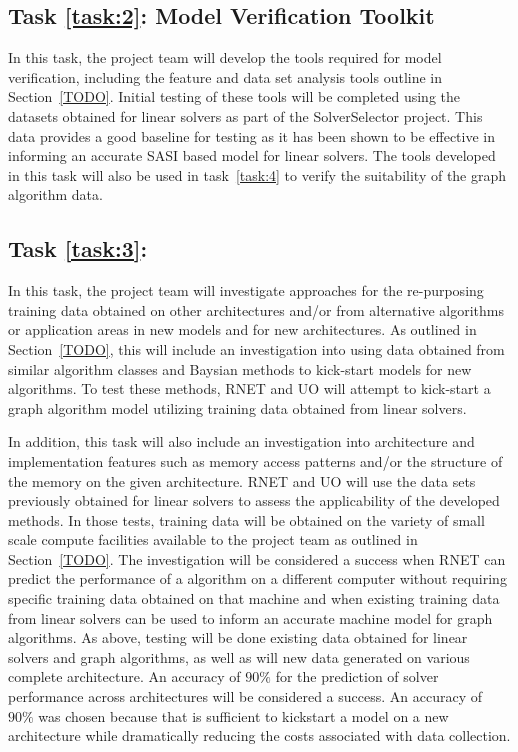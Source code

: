 \label{task:2}
\subsection{Task \ref{task:2}: Model Verification Toolkit }
In this task, the project team will develop the tools required for model verification, including the feature and data set analysis tools outline in Section~\ref{TODO}. Initial testing of these tools will be completed using the datasets obtained for linear solvers as part of the SolverSelector 
project. This data provides a good baseline for testing as it has been shown to be effective in informing an accurate SASI based model for linear solvers. The tools developed in this task will also be used in task~\ref{task:4} to verify the suitability of the graph algorithm data. 


\label{task:3}
\subsection{Task \ref{task:3}: }
In this task, the project team will investigate approaches for the re-purposing training data obtained on other architectures and/or from alternative algorithms or application areas in new models and for new architectures. As outlined in Section~\ref{TODO}, this will include an investigation into using data obtained from similar algorithm classes and Baysian methods to kick-start models for new algorithms. To test these methods, RNET and UO will attempt to kick-start a graph algorithm model utilizing training data obtained from linear solvers. 

In addition, this task will also include an investigation into architecture and implementation features such as memory access patterns and/or the structure of the memory on the given architecture. RNET and UO will use the data sets previously obtained for linear solvers to assess the applicability of the developed methods. In those tests, training data will be obtained on the variety of small scale compute facilities available to the project team as outlined in Section~\ref{TODO}. The investigation will be considered a success when RNET can predict the performance of a algorithm on a different computer without requiring specific training data obtained on that machine and when existing training data from linear solvers can be used to inform an accurate machine model for graph algorithms. As above, testing will be done existing data obtained for linear solvers and graph algorithms, as well as will new data generated on various complete architecture. An accuracy of $90\%$ for the prediction of solver performance across architectures will be considered a success. An accuracy of $90\%$ was chosen because that is sufficient to kickstart a model on a new architecture while dramatically reducing the costs associated with data collection. 


